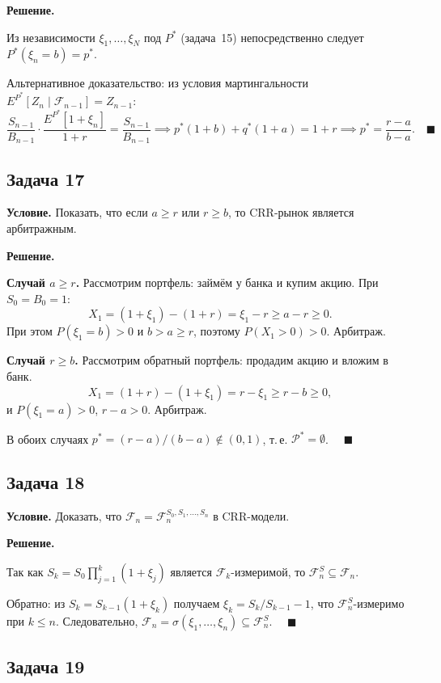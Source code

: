 \documentclass[12pt,a4paper]{article}
\theoremstyle{zadacha}
\begin{document}
\medskip
\textbf{Решение.}

Из независимости $\xi_1, \ldots, \xi_N$ под $P^*$ (задача~15) непосредственно следует $P^*(\xi_n = b) = p^*$.

Альтернативное доказательство: из условия мартингальности $E^{P^*}[Z_n \mid \mathcal{F}_{n-1}] = Z_{n-1}$:
\[
\frac{S_{n-1}}{B_{n-1}} \cdot \frac{E^{P^*}[1+\xi_n]}{1+r} = \frac{S_{n-1}}{B_{n-1}}
\implies p^*(1+b) + q^*(1+a) = 1+r
\implies p^* = \frac{r-a}{b-a}. \quad\blacksquare
\]

\subsection*{Задача 17}

\textbf{Условие.} Показать, что если $a \geq r$ или $r \geq b$, то CRR-рынок является арбитражным.

\medskip
\textbf{Решение.}

\textbf{Случай $a \geq r$.} Рассмотрим портфель: займём у банка и купим акцию. При $S_0 = B_0 = 1$:
\[
X_1 = (1+\xi_1) - (1+r) = \xi_1 - r \geq a - r \geq 0.
\]
При этом $P(\xi_1 = b) > 0$ и $b > a \geq r$, поэтому $P(X_1 > 0) > 0$. Арбитраж.

\textbf{Случай $r \geq b$.} Рассмотрим обратный портфель: продадим акцию и вложим в банк.
\[
X_1 = (1+r) - (1+\xi_1) = r - \xi_1 \geq r - b \geq 0,
\]
и $P(\xi_1 = a) > 0$, $r - a > 0$. Арбитраж.

В обоих случаях $p^* = (r-a)/(b-a) \notin (0,1)$, т.\,е. $\mathcal{P}^* = \emptyset$. $\quad\blacksquare$

\subsection*{Задача 18}

\textbf{Условие.} Доказать, что $\mathcal{F}_n = \mathcal{F}_n^{S_0, S_1, \ldots, S_n}$ в CRR-модели.

\medskip
\textbf{Решение.}

Так как $S_k = S_0 \prod_{j=1}^k (1+\xi_j)$ является $\mathcal{F}_k$-измеримой, то $\mathcal{F}_n^S \subseteq \mathcal{F}_n$.

Обратно: из $S_k = S_{k-1}(1+\xi_k)$ получаем $\xi_k = S_k/S_{k-1} - 1$, что $\mathcal{F}_n^S$-измеримо при $k \leq n$. Следовательно, $\mathcal{F}_n = \sigma(\xi_1, \ldots, \xi_n) \subseteq \mathcal{F}_n^S$. $\quad\blacksquare$

\subsection*{Задача 19}
\end{document}
